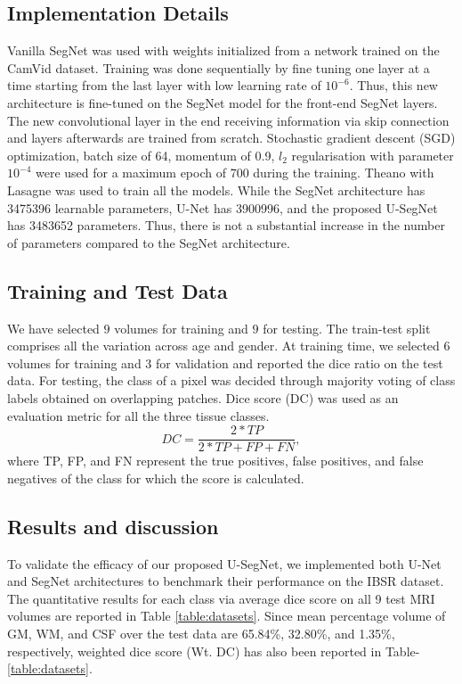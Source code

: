 \documentclass{article}
\begin{document}
\subsection{Implementation Details}
Vanilla SegNet was used with weights initialized from a network trained on the CamVid \cite{BrostowSFC:ECCV08,BrostowFC:PRL2008} dataset. Training was done sequentially by fine tuning one layer at a time starting from the last layer with low learning rate of $10^{-6}$. Thus, this new architecture is fine-tuned on the SegNet model for the front-end SegNet layers. The new convolutional layer in the end receiving information via skip connection and layers afterwards are trained from scratch. Stochastic gradient descent (SGD) optimization, batch size of 64, momentum of 0.9, $l_2$ regularisation with parameter $10^{-4}$ were used for a maximum epoch of 700 during the training. Theano with Lasagne was used to train all the models. While the SegNet architecture has 3475396 learnable parameters, U-Net has 3900996, and the proposed U-SegNet has 3483652 parameters. Thus, there is not a substantial increase in the number of parameters compared to the SegNet architecture.

\subsection{Training and Test Data}
We have selected $9$ volumes for training and $9$ for testing. The train-test split comprises all the variation across age and gender. At training time, we selected $6$ volumes for training and $3$ for validation and reported the dice ratio on the test data. For testing, the class of a pixel was decided through majority voting of class labels obtained on overlapping patches. Dice score (DC)  was used as an evaluation metric for all the three tissue classes.
\begin{equation}
\label{eqn}
DC = \frac{2*TP}{2*TP + FP + FN},\nonumber
\end{equation}
where TP, FP, and FN represent the true positives, false positives, and false negatives of the class for which the score is calculated.

\subsection{Results and discussion}

To validate the efficacy of our proposed U-SegNet, we implemented both U-Net and SegNet architectures to benchmark their performance on the IBSR dataset. The quantitative results for each class via average dice score on all 9 test MRI volumes are reported in Table \ref{table:datasets}. Since mean percentage volume of GM, WM, and CSF over the test data are 65.84\%, 32.80\%, and 1.35\%, respectively, weighted dice score (Wt. DC) has also been reported in Table-\ref{table:datasets}.
\end{document}
